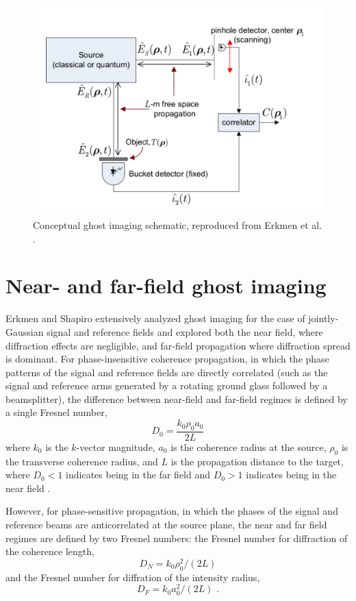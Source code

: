 \begin{figure}[htb]
\centerline{\includegraphics[width=12cm]{figure-ghost-schematic.pdf}}
\caption{Conceptual ghost imaging schematic, reproduced from Erkmen et al. \cite{erkmen-unified}.}
\label{figure:ghost-schematic}
\end{figure}

\section{Near- and far-field ghost imaging}

Erkmen and Shapiro extensively analyzed ghost imaging for the case of jointly-Gaussian signal and reference fields and explored both the near field, where diffraction effects are negligible, and far-field propagation where diffraction spread is dominant. For phase-insensitive coherence propagation, in which the phase patterns of the signal and reference fields are directly correlated (such as the signal and reference arms generated by a rotating ground glass followed by a beamsplitter), the difference between near-field and far-field regimes is defined by a single Fresnel number,
\begin{equation}
D_0 = \frac{k_0 \rho_0 a_0}{2L}
\end{equation}
where $k_0$ is the $k$-vector magnitude, $a_0$ is the coherence radius at the source, $\rho_0$ is the transverse coherence radius, and $L$ is the propagation distance to the target, where $D_0 < 1$ indicates being in the far field and $D_0 > 1$ indicates being in the near field \cite{erkmen-unified}.

However, for phase-sensitive propagation, in which the phases of the signal and reference beams are anticorrelated at the source plane, the near and far field regimes are defined by two Fresnel numbers: the Fresnel number for diffraction of the coherence length,
\begin{equation}
D_N = k_0 \rho_0 ^2 / (2L)
\end{equation}
and the Fresnel number for diffration of the intensity radius,
\begin{equation}
D_F = k_0 a_0^2 / (2L)\,\,.
\end{equation}

